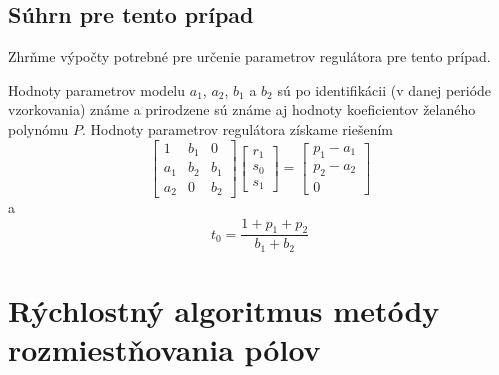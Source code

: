 \documentclass[a4paper, 10pt, ]{article}
\begin{document}
\subsection{Súhrn pre tento prípad}

Zhrňme výpočty potrebné pre určenie parametrov regulátora pre tento prípad.

Hodnoty parametrov modelu $a_1$, $a_2$, $b_1$ a $b_2$ sú po identifikácii (v danej perióde vzorkovania) známe a prirodzene sú známe aj hodnoty koeficientov želaného polynómu $P$. Hodnoty parametrov regulátora získame riešením
\begin{equation}
	\begin{bmatrix} 1 & b_1 & 0 \\ a_1 & b_2 & b_1 \\ a_2 &   0 & b_2 \end{bmatrix}
	\begin{bmatrix} r_1 \\ s_0 \\ s_1  \end{bmatrix}
	=
	\begin{bmatrix} p_1 - a_1 \\ p_2 - a_2 \\ 0 \end{bmatrix}
\end{equation}
a
\begin{equation}
		t_0 = \frac{1 + p_1 + p_2}{b_1 + b_2}
\end{equation}
















\section{Rýchlostný algoritmus metódy rozmiestňovania pólov}
\end{document}
